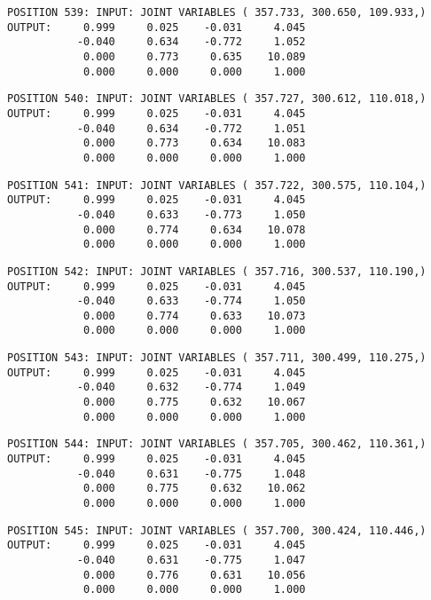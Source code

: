 \begin{verbatim}
POSITION 539: INPUT: JOINT VARIABLES ( 357.733, 300.650, 109.933,)
OUTPUT:     0.999     0.025    -0.031     4.045
           -0.040     0.634    -0.772     1.052
            0.000     0.773     0.635    10.089
            0.000     0.000     0.000     1.000
\end{verbatim} \pagebreak[1]\begin{verbatim}
POSITION 540: INPUT: JOINT VARIABLES ( 357.727, 300.612, 110.018,)
OUTPUT:     0.999     0.025    -0.031     4.045
           -0.040     0.634    -0.772     1.051
            0.000     0.773     0.634    10.083
            0.000     0.000     0.000     1.000
\end{verbatim} \pagebreak[1]\begin{verbatim}
POSITION 541: INPUT: JOINT VARIABLES ( 357.722, 300.575, 110.104,)
OUTPUT:     0.999     0.025    -0.031     4.045
           -0.040     0.633    -0.773     1.050
            0.000     0.774     0.634    10.078
            0.000     0.000     0.000     1.000
\end{verbatim} \pagebreak[1]\begin{verbatim}
POSITION 542: INPUT: JOINT VARIABLES ( 357.716, 300.537, 110.190,)
OUTPUT:     0.999     0.025    -0.031     4.045
           -0.040     0.633    -0.774     1.050
            0.000     0.774     0.633    10.073
            0.000     0.000     0.000     1.000
\end{verbatim} \pagebreak[1]\begin{verbatim}
POSITION 543: INPUT: JOINT VARIABLES ( 357.711, 300.499, 110.275,)
OUTPUT:     0.999     0.025    -0.031     4.045
           -0.040     0.632    -0.774     1.049
            0.000     0.775     0.632    10.067
            0.000     0.000     0.000     1.000
\end{verbatim} \pagebreak[1]\begin{verbatim}
POSITION 544: INPUT: JOINT VARIABLES ( 357.705, 300.462, 110.361,)
OUTPUT:     0.999     0.025    -0.031     4.045
           -0.040     0.631    -0.775     1.048
            0.000     0.775     0.632    10.062
            0.000     0.000     0.000     1.000
\end{verbatim} \pagebreak[1]\begin{verbatim}
POSITION 545: INPUT: JOINT VARIABLES ( 357.700, 300.424, 110.446,)
OUTPUT:     0.999     0.025    -0.031     4.045
           -0.040     0.631    -0.775     1.047
            0.000     0.776     0.631    10.056
            0.000     0.000     0.000     1.000
\end{verbatim} \pagebreak[1]\begin{verbatim}

\end{verbatim}
